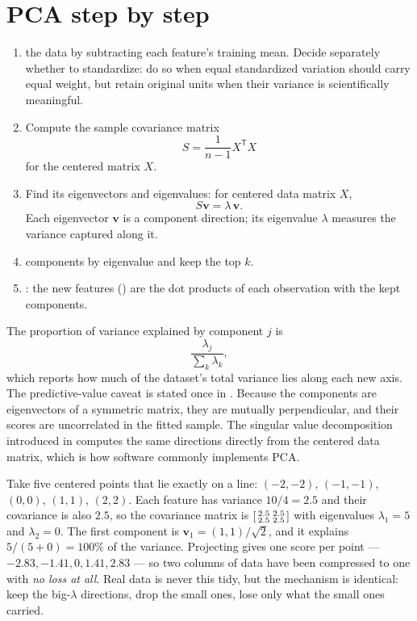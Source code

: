 \section{PCA step by step}

\begin{enumerate}
  \item {} the data by subtracting each feature's training mean. Decide separately whether to standardize: do so when equal standardized variation should carry equal weight, but retain original units when their variance is scientifically meaningful.
  \item Compute the sample covariance matrix
  \[
    S=\frac{1}{n-1}X^{\mathsf T}X
  \]
  for the centered matrix $X$.
  \item Find its eigenvectors and eigenvalues: for centered data matrix $X$,
  \[
    S\bm{v}=\lambda\,\bm{v}.
  \]
  Each eigenvector $\bm{v}$ is a component direction; its eigenvalue $\lambda$ measures the variance captured along it.
  \item {} components by eigenvalue and keep the top $k$.
  \item {}: the new features () are the dot products of each observation with the kept components.
\end{enumerate}

The proportion of variance explained by component $j$ is
\[
  \frac{\lambda_j}{\sum_{k}\lambda_k},
\]
which reports how much of the dataset's total variance lies along each new axis. The predictive-value caveat is stated once in . Because the components are eigenvectors of a symmetric matrix, they are mutually perpendicular, and their scores are uncorrelated in the fitted sample. The singular value decomposition introduced in  computes the same directions directly from the centered data matrix, which is how software commonly implements PCA.

\begin{workedexample}
Take five centered points that lie exactly on a line: $(-2,-2)$, $(-1,-1)$, $(0,0)$, $(1,1)$, $(2,2)$. Each feature has variance $10/4=2.5$ and their covariance is also $2.5$, so the covariance matrix is
$\begin{bsmallmatrix}2.5 & 2.5\\ 2.5 & 2.5\end{bsmallmatrix}$
with eigenvalues $\lambda_1=5$ and $\lambda_2=0$. The first component is $\bm{v}_1=(1,1)/\sqrt{2}$, and it explains $5/(5+0)=100\%$ of the variance. Projecting gives one score per point --- $-2.83, -1.41, 0, 1.41, 2.83$ --- so two columns of data have been compressed to one with \emph{no loss at all}. Real data is never this tidy, but the mechanism is identical: keep the big-$\lambda$ directions, drop the small ones, lose only what the small ones carried.
\end{workedexample}

